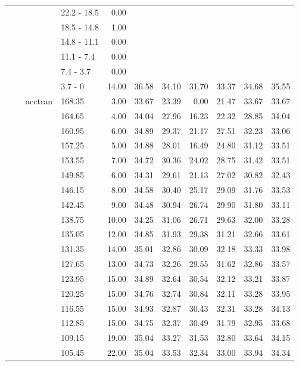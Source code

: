 \begin{longtable}{llllrrrrrrr}
   &  &  & 22.2 - 18.5 & 0.00 &  &  &  &  &  &  \\ 
   &  &  & 18.5 - 14.8 & 1.00 &  &  &  &  &  &  \\ 
   &  &  & 14.8 - 11.1 & 0.00 &  &  &  &  &  &  \\ 
   &  &  & 11.1 - 7.4 & 0.00 &  &  &  &  &  &  \\ 
   &  &  & 7.4 - 3.7 & 0.00 &  &  &  &  &  &  \\ 
   &  &  & 3.7 - 0 & 14.00 & 36.58 & 34.10 & 31.70 & 33.37 & 34.68 & 35.55 \\ 
   &  & acctran & 168.35 & 3.00 & 33.67 & 23.39 & 0.00 & 21.47 & 33.67 & 33.67 \\ 
   &  &  & 164.65 & 4.00 & 34.04 & 27.96 & 16.23 & 22.32 & 28.85 & 34.04 \\ 
   &  &  & 160.95 & 6.00 & 34.89 & 29.37 & 21.17 & 27.51 & 32.23 & 33.06 \\ 
   &  &  & 157.25 & 5.00 & 34.88 & 28.01 & 16.49 & 24.80 & 31.12 & 33.51 \\ 
   &  &  & 153.55 & 7.00 & 34.72 & 30.36 & 24.02 & 28.75 & 31.42 & 33.51 \\ 
   &  &  & 149.85 & 6.00 & 34.31 & 29.61 & 21.13 & 27.02 & 30.82 & 32.43 \\ 
   &  &  & 146.15 & 8.00 & 34.58 & 30.40 & 25.17 & 29.09 & 31.76 & 33.53 \\ 
   &  &  & 142.45 & 9.00 & 34.48 & 30.94 & 26.74 & 29.90 & 31.80 & 33.11 \\ 
   &  &  & 138.75 & 10.00 & 34.25 & 31.06 & 26.71 & 29.63 & 32.00 & 33.28 \\ 
   &  &  & 135.05 & 12.00 & 34.85 & 31.93 & 29.38 & 31.21 & 32.66 & 33.61 \\ 
   &  &  & 131.35 & 14.00 & 35.01 & 32.86 & 30.09 & 32.18 & 33.33 & 33.98 \\ 
   &  &  & 127.65 & 13.00 & 34.73 & 32.26 & 29.55 & 31.62 & 32.86 & 33.57 \\ 
   &  &  & 123.95 & 15.00 & 34.89 & 32.64 & 30.54 & 32.12 & 33.21 & 33.87 \\ 
   &  &  & 120.25 & 15.00 & 34.76 & 32.74 & 30.84 & 32.11 & 33.28 & 33.95 \\ 
   &  &  & 116.55 & 15.00 & 34.93 & 32.87 & 30.43 & 32.31 & 33.28 & 34.13 \\ 
   &  &  & 112.85 & 15.00 & 34.75 & 32.37 & 30.49 & 31.79 & 32.95 & 33.68 \\ 
   &  &  & 109.15 & 19.00 & 35.04 & 33.27 & 31.53 & 32.80 & 33.64 & 34.15 \\ 
   &  &  & 105.45 & 22.00 & 35.04 & 33.53 & 32.34 & 33.00 & 33.94 & 34.34 \\ 

\end{longtable}
